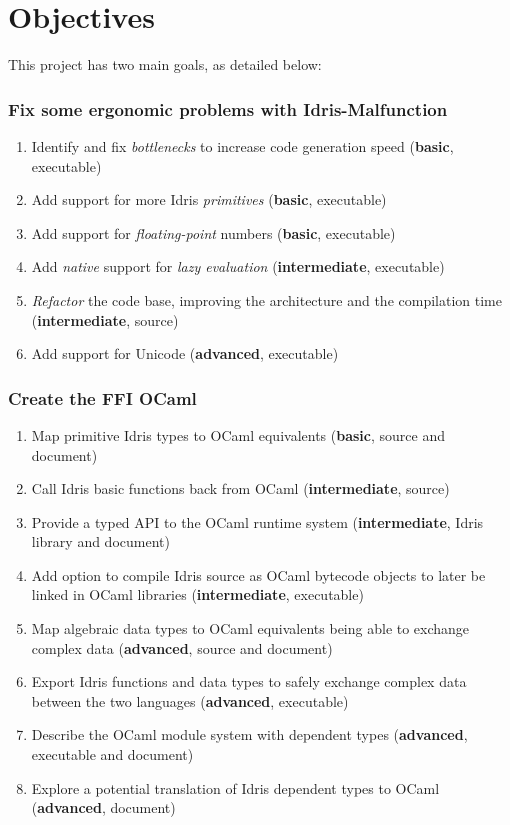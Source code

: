 \section{Objectives}
This project has two main goals, as detailed below:

\subsubsection{Fix some ergonomic problems with Idris-Malfunction}
\begin{enumerate}
	\item Identify and fix \emph{bottlenecks} to increase code generation
	      speed (\textbf{basic}, executable)
	\item Add support for more Idris
	      \emph{primitives} (\textbf{basic}, executable)
	\item Add support for \emph{floating-point} numbers
	      (\textbf{basic}, executable)
	\item Add \emph{native} support for \emph{lazy evaluation}
	      (\textbf{intermediate}, executable)
	\item \emph{Refactor} the code base, improving the architecture and
	      the compilation time (\textbf{intermediate}, source)
	\item Add support for Unicode (\textbf{advanced}, executable)
\end{enumerate}

\subsubsection{Create the FFI OCaml}
\begin{enumerate}
	\item Map primitive Idris types to OCaml equivalents
	      (\textbf{basic}, source and document)
	\item Call Idris basic functions
	      back from OCaml (\textbf{intermediate}, source)
	\item Provide a typed API to the OCaml runtime system
	      (\textbf{intermediate}, Idris library and document)
	\item Add option to compile Idris source as OCaml bytecode
	      objects to later be linked in OCaml libraries
	      (\textbf{intermediate}, executable)
	\item Map algebraic data types to OCaml equivalents
	      being able to exchange complex data
	      (\textbf{advanced}, source and document)
	\item Export Idris functions and data types to
	      safely exchange complex data between the two languages
	      (\textbf{advanced}, executable)
	\item Describe the OCaml module system with dependent types
	      (\textbf{advanced}, executable and document)
	\item Explore a potential translation of Idris dependent types
	      to OCaml (\textbf{advanced}, document)
\end{enumerate}

